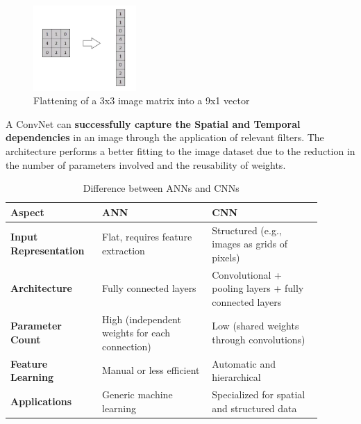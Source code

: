 \begin{figure}[h!]
    \centering
    \includegraphics[width=0.35\textwidth]{images/figure2.png}
    \caption{Flattening of a 3x3 image matrix into a 9x1 vector}
    \label{fig:2}
\end{figure}

A ConvNet can \textbf{successfully capture the Spatial and Temporal dependencies} in an image through the application of relevant filters. The architecture performs a better fitting to the image dataset due to the reduction in the number of parameters involved and the reusability of weights.\\

\begin{table}[h!]
\centering
\begin{tabular}{|p{0.25\linewidth}|p{0.32\linewidth}|p{0.32\linewidth}|} 
  \hline
  \rowcolor{lightgray} \textbf{Aspect} & \textbf{ANN} & \textbf{CNN} \\ 
  \hline\hline
  \textbf{Input Representation} & Flat, requires feature extraction & Structured (e.g., images as grids of pixels) \\ 
  \hline
  \textbf{Architecture} & Fully connected layers & Convolutional + pooling layers + fully connected layers \\ 
  \hline
  \textbf{Parameter Count} & High (independent weights for each connection) & Low (shared weights through convolutions) \\
  \hline
  \textbf{Feature Learning} & Manual or less efficient & Automatic and hierarchical \\
  \hline
  \textbf{Applications} & Generic machine learning & Specialized for spatial and structured data \\
  \hline
\end{tabular}
\caption{Difference between ANNs and CNNs}
\label{table:1}
\end{table}

